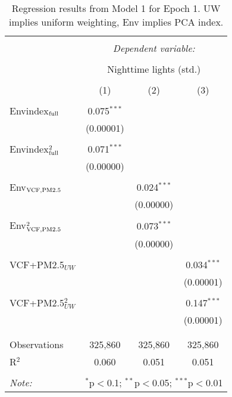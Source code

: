 
\begin{table}[H] \centering 
  \caption{Regression results from Model 1 for Epoch 1. UW implies uniform weighting, Env implies PCA index.} 
  \label{tab:mod1} 
\begin{tabular}{@{\extracolsep{5pt}}lccc} 
\\[-1.8ex]\hline 
\hline \\[-1.8ex] 
 & \multicolumn{3}{c}{\textit{Dependent variable:}} \\ 
\cline{2-4} 
\\[-1.8ex] & \multicolumn{3}{c}{Nighttime lights (std.)} \\ 
\\[-1.8ex] & (1) & (2) & (3)\\ 
\hline \\[-1.8ex] 
 Envindex$_{\rm{full}}$ & 0.075$^{***}$ &  &  \\ 
  & (0.00001) &  &  \\ 
  & & & \\ 
  Envindex$_{\rm{full}}^2$ & 0.071$^{***}$ &  &  \\ 
  & (0.00000) &  &  \\ 
  & & & \\ 
 Env$_{\rm{VCF,PM2.5}}$ &  & 0.024$^{***}$ &  \\ 
  &  & (0.00000) &  \\ 
  & & & \\ 
 Env$_{\rm{VCF,PM2.5}}^2$ &  & 0.073$^{***}$ &  \\ 
  &  & (0.00000) &  \\ 
  & & & \\ 
 VCF+PM2.5$_{UW}$ &  &  & 0.034$^{***}$ \\ 
  &  &  & (0.00001) \\ 
  & & & \\ 
 VCF+PM2.5$_{UW}^2$ &  &  & 0.147$^{***}$ \\ 
  &  &  & (0.00001) \\ 
  & & & \\ 
\hline \\[-1.8ex] 
Observations & 325,860 & 325,860 & 325,860 \\ 
R$^{2}$ & 0.060 & 0.051 & 0.051 \\ 
\hline 
\hline \\[-1.8ex] 
\textit{Note:}  & \multicolumn{3}{r}{$^{*}$p$<$0.1; $^{**}$p$<$0.05; $^{***}$p$<$0.01} \\ 
\end{tabular} 
\end{table} 
